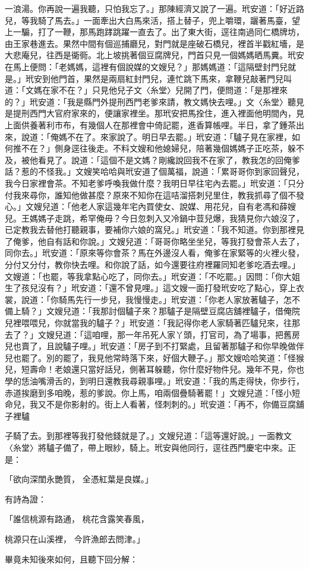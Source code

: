 \begin{showcontents}{}
一浪湯。你再說一遍我聽，只怕我忘了。」那陳經濟又說了一遍。玳安道：「好近路兒，等我騎了馬去。」一面牽出大白馬來活，搭上替子，兜上嚼環，躧著馬臺，望上一騸，打了一鞭，那馬跑踍跳躍一直去了。出了東大街，逕往南過同仁橋牌坊，由王家巷進去。果然中間有個巡捕廳兒，對門就是座破石橋兒，裡首半戳紅墻，是大悲庵兒，往西是衚衕。北上坡挑著個豆腐牌兒，門首只見一個媽媽晒馬糞。玳安在馬上便問：「老媽媽，這裡有個說媒的文嫂兒？」那媽媽道：「這隔壁封門兒就是。」玳安到他門首，果然是兩扇紅封門兒，連忙跳下馬來，拿鞭兒敲著門兒叫道：「文媽在家不在？」只見他兒子文〈糸堂〉兒開了門，便問道：「是那裡來的？」玳安道：「我是縣門外提刑西門老爹來請，教文媽快去哩。」文〈糸堂〉聽見是提刑西門大官府家來的，便讓家裡坐。那玳安把馬拴住，進入裡面他明間內，見上面供養著利市布，有幾個人在那裡會中倚記罷，進香算帳哩。半日，拿了鍾茶出來，說道：「俺媽不在了。來家說了。明日早去罷。」玳安道：「驢子見在家裡，如何推不在？」側身逕往後走。不料文嫂和他媳婦兒，陪著幾個媽媽子正吃茶，躲不及，被他看見了。說道：「這個不是文媽？剛纔說回我不在家了，教我怎的回俺爹話？惹的不怪我。」文嫂笑哈哈與玳安道了個萬福，說道：「累哥哥你到家回聲兒，我今日家裡會茶。不知老爹呼喚我做什麼？我明日早往宅內去罷。」玳安道：「只分付我來尋你，誰知他做甚麼？原來不知你在這咭溜搭刺兒里住，教我抓尋了個不發心。」文嫂兒道：「他老人家這幾年宅內買使女、說媒、用花兒，自有老馮和薛嫂兒。王媽媽子走跳，希罕俺毋？今日忽刺入又冷鍋中荳兒爆，我猜見你六娘沒了，已定教我去替他打聽親事，要補你六娘的窩兒。」玳安道：「我不知道。你到那裡見了俺爹，他自有話和你說。」文嫂兒道：「哥哥你略坐坐兒，等我打發會茶人去了，同你去。」玳安道：「原來等你會茶？馬在外邊沒人看，俺爹在家緊等的火裡火發，分付又分付，教你快去哩。和你說了話，如今還要往府裡羅同知老爹吃酒去哩。」文嫂道：「也罷，等我拿點心吃了，同你去。」玳安道：「不吃罷。」因問：「你大姐生了孩兒沒有？」玳安道：「還不曾見哩。」這文嫂一面打發玳安吃了點心，穿上衣裳，說道：「你騎馬先行一步兒，我慢慢走。」玳安道：「你老人家放著驢子，怎不備上騎？」文嫂兒道：「我那討個驢子來？那驢子是隔壁豆腐店舖裡驢子，借俺院兒裡喂喂兒，你就當我的驢子？」玳安道：「我記得你老人家騎著匹驢兒來，往那去了？」文嫂兒道：「這咱哩，那一年吊死人家丫頭，打官司，為了場事，把舊房兒也賣了，且說驢子哩。」玳安道：「房子到不打緊處，且留著那驢子和你早晚做伴兒也罷了。別的罷了，我見他常時落下來，好個大鞭子。」那文嫂哈哈笑道：「怪猴兒，短壽命！老娘還只當好話兒，側著耳躲聽，你什麼好物件兒。幾年不見，你也學的恁油嘴滑舌的，到明日還教我尋親事哩。」玳安道：「我的馬走得快，你步行，赤道挨磨到多咱晚，惹的爹說。你上馬，咱兩個疊騎著罷！」文嫂兒道：「怪小短命兒，我又不是你影射的。街上人看著，怪刺刺的。」玳安道：「再不，你備豆腐舖子裡驢

子騎了去。到那裡等我打發他錢就是了。」文嫂兒道：「這等還好說。」一面教文〈糸堂〉將驢子備了，帶上眼紗，騎上。玳安與他同行，逕往西門慶宅中來。正是：

「欲向深閨永艷質，  全憑紅葉是良媒。」

有詩為證：

「誰信桃源有路通，  桃花含露笑春風，

桃源只在山溪裡，  今許漁郎去問津。」

畢竟未知後來如何，且聽下回分解：





\end{showcontents}


